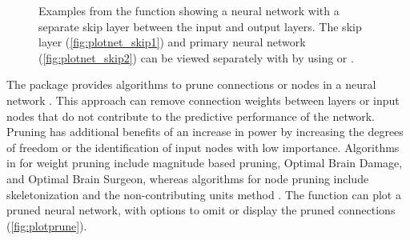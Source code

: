 \documentclass[article,shortnames]{jss}\usepackage[]{graphicx}\usepackage[]{color}
\newenvironment{knitrout}{}{} %
\begin{document}
\begin{knitrout}
\begin{figure}[!ht]
{}

\caption{Examples from the  function showing a neural network with a separate skip layer between the input and output layers.  The skip layer (\ref{fig:plotnet_skip1}) and primary neural network (\ref{fig:plotnet_skip2}) can be viewed separately with  by using  or .}\label{fig:plotnet_skip}
\end{figure}


\end{knitrout}

The  package provides algorithms to prune connections or nodes in a neural network \citep{Bergmeir12}.  This approach can remove connection weights between layers or input nodes that do not contribute to the predictive performance of the network.  Pruning has additional benefits of an increase in power by increasing the degrees of freedom or the identification of input nodes with low importance.  Algorithms in  for weight pruning include magnitude based pruning, Optimal Brain Damage, and Optimal Brain Surgeon, whereas algorithms for node pruning include skeletonization and the non-contributing units method \citep{Zell98}.  The  function can plot a pruned neural network, with options to omit or display the pruned connections (\cref{fig:plotprune}).  
\end{document}

